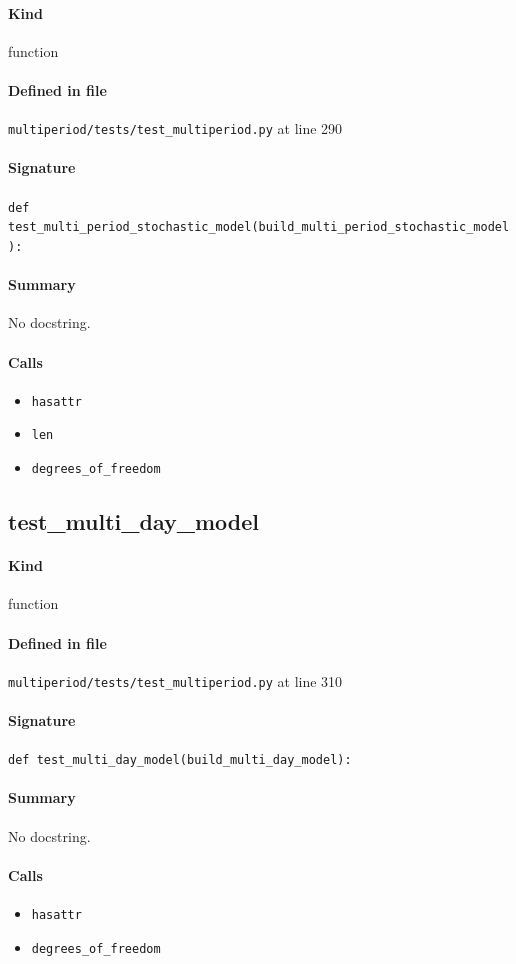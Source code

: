 \documentclass[11pt]{report}
\begin{document}
\paragraph{Kind} function
\paragraph{Defined in file} \texttt{multiperiod/tests/test\_multiperiod.py} at line 290
\paragraph{Signature} \texttt{def test\_multi\_period\_stochastic\_model(build\_multi\_period\_stochastic\_model):}
\paragraph{Summary} No docstring.
\paragraph{Calls}
\begin{itemize}[leftmargin=*]
  \item \texttt{hasattr}
  \item \texttt{len}
  \item \texttt{degrees\_of\_freedom}
\end{itemize}
\subsection{test\_multi\_day\_model}
\label{def:multiperiod-tests-test_multiperiod.py:test_multi_day_model:L310}
\paragraph{Kind} function
\paragraph{Defined in file} \texttt{multiperiod/tests/test\_multiperiod.py} at line 310
\paragraph{Signature} \texttt{def test\_multi\_day\_model(build\_multi\_day\_model):}
\paragraph{Summary} No docstring.
\paragraph{Calls}
\begin{itemize}[leftmargin=*]
  \item \texttt{hasattr}
  \item \texttt{degrees\_of\_freedom}
\end{itemize}
\end{document}
